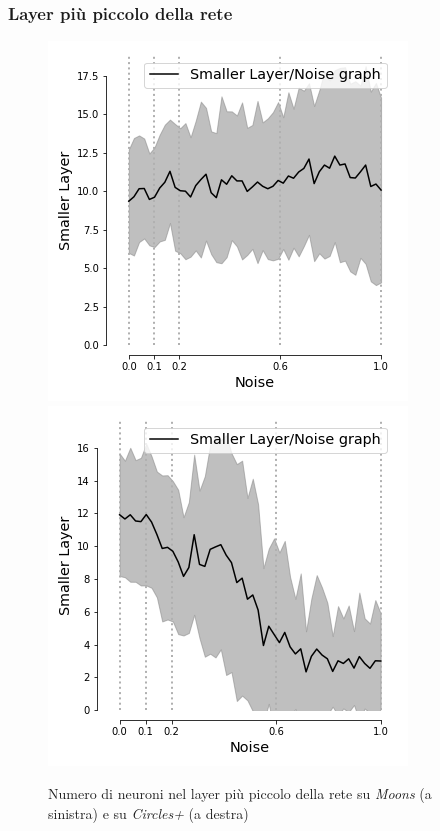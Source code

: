 \documentclass{beamer}
\begin{document}
\begin{frame}
 \frametitle{Layer più piccolo della rete }
    \begin{figure}
    \includegraphics[scale = 0.4]{images/small_noise_moons.png}
    \includegraphics[scale = 0.4]{images/small_noise_circles+.png}
    \caption{Numero di neuroni nel layer più piccolo della rete su \textit{Moons} (a sinistra) e su \textit{Circles+} (a destra)}
 \end{figure}
\end{frame}
\end{document}
